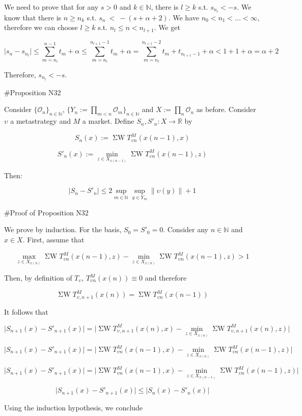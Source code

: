 \documentclass[a4paper]{article}
\newcommand{\Nats}{\mathbb{N}}
\newcommand{\Reals}{\mathbb{R}}
\newcommand{\Sq}[2]{\{#1\}_{#2 \in \Nats}}
\newcommand{\Sqn}[1]{\Sq{#1}{n}}
\newcommand{\Abs}[1]{\lvert #1 \rvert}
\newcommand{\Norm}[1]{\lVert #1 \rVert}
\newcommand{\Ob}{\mathcal{O}}
\newcommand{\SW}{\operatorname{\Sigma W}}
\begin{document}
We need to prove that for any ${s > 0}$ and ${k \in \Nats}$, there is ${l \geq k}$ s.t. ${s_{n_l} < -s}$. We know that there is ${n \geq n_k}$ s.t. ${s_n\ <\ -(s+\alpha+2)}$. We have ${n_0 < n_1 < \ldots < \infty}$, therefore we can choose ${l \geq k}$ s.t. ${n_l \leq n < n_{l+1}}$. We get

$$\Abs{s_n-s_{n_l}} \leq \sum_{m=n_l}^{n - 1} t_m + \alpha \leq \sum_{m=n_l}^{n_{l+1} - 1} t_m  + \alpha = \sum_{m=n_l}^{n_{l+1} - 2} t_m + t_{n_{l+1}-1} + \alpha < 1 + 1  + \alpha = \alpha + 2$$

Therefore, ${s_{n_l} < -s}$.

\#Proposition N32

Consider ${\Sqn{\Ob_n}}$, ${\Sqn{Y_n:=\prod_{m < n} \Ob_m}}$ and ${X:=\prod_n \Ob_n}$ as before. Consider ${\upsilon}$ a metastrategy and ${M}$ a market. Define ${S_n,S'_n: X \rightarrow \Reals}$ by 

$$S_n(x):= \SW T^M_{\upsilon n}(x(n-1),x)$$

$$S'_n(x):= \min_{z \in X_{x(n-1)}} \SW T^M_{\upsilon n}(x(n-1),z)$$

Then: 

$${\Abs{S_n-S'_n} \leq 2 \sup_{m \in \Nats} \sup_{y \in Y_m} \Norm{\upsilon(y)}} + 1$$

\#Proof of Proposition N32

We prove by induction. For the basis, $S_0=S'_0=0$. Consider any ${n \in \Nats}$ and ${x \in X}$. First, assume that

$$\max_{z \in X_{x(n)}} \SW T^M_{\upsilon n}(x(n-1),z)-\min_{z \in X_{x(n)}} \SW T^M_{\upsilon n}(x(n-1),z) > 1$$

Then, by definition of ${T_\upsilon}$, ${T^M_{\upsilon n}}(x(n)) \equiv 0$ and therefore

$$\SW T^M_{\upsilon,n+1}(x(n))=\SW T^M_{\upsilon n}(x(n-1))$$

It follows that

$$\Abs{S_{n+1}(x)-S'_{n+1}(x)} = \Abs{\SW T^M_{\upsilon,n+1}(x(n),x) - \min_{z \in X_{x(n)}}\SW T^M_{\upsilon,n+1}(x(n),z)}$$

$$\Abs{S_{n+1}(x)-S'_{n+1}(x)} = \Abs{\SW T^M_{\upsilon n}(x(n-1),x) - \min_{z \in X_{x(n)}}\SW T^M_{\upsilon n}(x(n-1),z)}$$

$$\Abs{S_{n+1}(x)-S'_{n+1}(x)} = \Abs{\SW T^M_{\upsilon n}(x(n-1),x) - \min_{z \in X_{x(n-1)}}\SW T^M_{\upsilon n}(x(n-1),z)}$$

$$\Abs{S_{n+1}(x)-S'_{n+1}(x)} \leq \Abs{S_n(x)-S'_n(x)}$$

Using the induction hypothesis, we conclude
\end{document}
